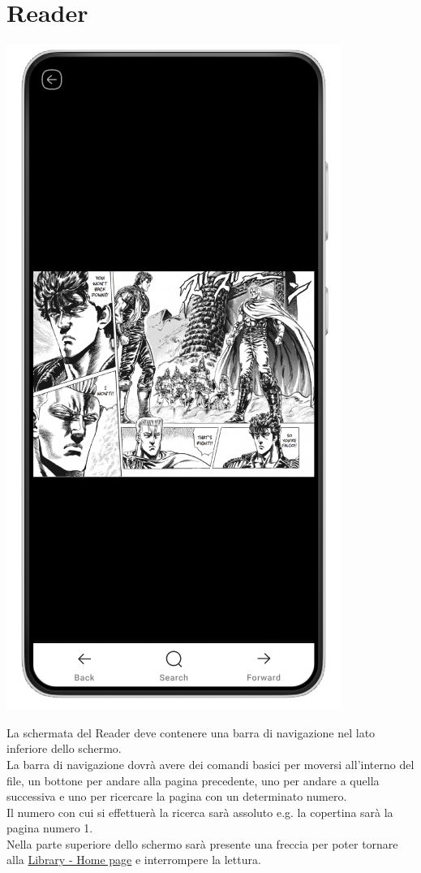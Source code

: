 \documentclass{report}
\begin{document}
\section{Reader}
\label{sec:reader}

\begin{center}
   \includegraphics[scale=0.4]{reader.png}   
\end{center}

La schermata del Reader deve contenere una barra di navigazione nel lato inferiore dello schermo.\\
La barra di navigazione dovrà avere dei comandi basici per moversi all'interno del file, un bottone per andare alla pagina precedente, uno per andare a quella successiva e uno per ricercare la pagina con un determinato numero.\\
Il numero con cui si effettuerà la ricerca sarà assoluto e.g. la copertina sarà la pagina numero 1.\\
Nella parte superiore dello schermo sarà presente una freccia per poter tornare alla \hyperref[sec:home]{Library - Home page} e interrompere la lettura.
\end{document}
